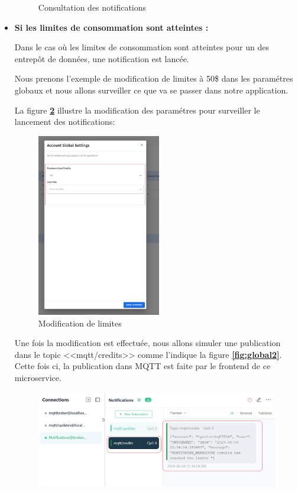 \begin{itemize}
\begin{figure}[H]
\begin{tabular}[b]{c}
            \end{tabular}
            \caption{Consultation des notifications}
        \label{fig:step4}
        \end{figure}

    \item \textbf{Si les limites de consommation sont atteintes :}
    \par Dans le cas où les limites de consommation sont atteintes pour un des entrepôt de données, une notification est lancée. 
    \par Nous prenons l'exemple de modification de limites à 50\$ dans les paramétres globaux et nous allons surveiller ce que va se passer dans notre application. 
    \par La figure \textbf{\ref{fig:global1}} illustre la modification des paramétres pour surveiller le lancement des notifications:
    \begin{figure}[H]
        \centering
        \includegraphics[width=0.3\linewidth ,height=8cm]{img/captures/notifications/settings.png}
        \caption{Modification de limites}
        \label{fig:global1}
    \end{figure}
    \par Une fois la modification est effectuée, nous allons simuler une publication dans le topic <<mqtt/credits>> comme l'indique la figure \textbf{\ref{fig:global2}}. 
    \\ Cette fois ci, la publication dans MQTT est faite par le frontend de ce microservice.
    \begin{figure}[H]
        \centering
        \includegraphics[width =1\linewidth]{img/captures/notifications/mqtt_global.png}

\end{figure}
\end{itemize}
